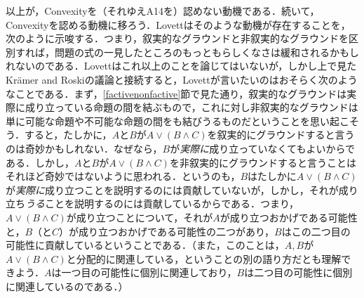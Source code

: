 \documentclass[twoside,14Q,dvipdfmx]{jsarticle}
\theoremstyle{definition}
\begin{document}
以上が，Convexityを（それゆえA14を）認めない動機である．続いて，Convexityを認める動機に移ろう．Lovett\cite[p.23fn20]{Lovett2020}はそのような動機が存在することを，次のように示唆する．つまり，叙実的なグラウンドと非叙実的なグラウンドを区別すれば，問題の式の一見したところのもっともらしくなさは緩和されるかもしれないのである．Lovettはこれ以上のことを論じてはいないが，しかし上で見たKr\"{a}mer and Roskiの議論と接続すると，Lovettが言いたいのはおそらく次のようなことである．まず，\ref{factivenonfactive}節で見た通り，叙実的なグラウンドは実際に成り立っている命題の間を結ぶもので，これに対し非叙実的なグラウンドは単に可能な命題や不可能な命題の間をも結びうるものだということを思い起こそう．すると，たしかに，$A$と$B$が$A\lor(B\land C)$を叙実的にグラウンドすると言うのは奇妙かもしれない．なぜなら，$B$が\emph{実際に}成り立っていなくてもよいからである．しかし，$A$と$B$が$A\lor(B\land C)$を非叙実的にグラウンドすると言うことはそれほど奇妙ではないように思われる．というのも，$B$はたしかに$A\lor(B\land C)$が\emph{実際に}成り立つことを説明するのには貢献していないが，しかし，それが成り立ち\emph{うる}ことを説明するのには貢献しているからである．つまり，$A\lor(B\land C)$が成り立つことについて，それが$A$が成り立つおかげである可能性と，$B$（と$C$）が成り立つおかげである可能性の二つがあり，$B$はこの二つ目の可能性に貢献しているということである．（また，このことは，$A, B$が$A\lor(B\land C)$と分配的に関連している，ということの別の語り方だとも理解できよう．$A$は一つ目の可能性に個別に関連しており，$B$は二つ目の可能性に個別に関連しているのである．）
\end{document}
